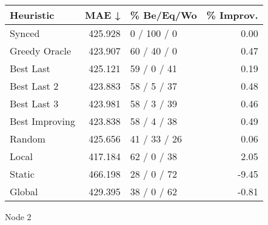 \begin{tabular}{lrlr}
\toprule
\textbf{Heuristic} & \textbf{MAE ↓} & \textbf{\% Be/Eq/Wo} & \textbf{\% Improv.} \\
\midrule
            Synced &        425.928 &          0 / 100 / 0 &                0.00 \\
     Greedy Oracle &        423.907 &          60 / 40 / 0 &                0.47 \\
         Best Last &        425.121 &          59 / 0 / 41 &                0.19 \\
       Best Last 2 &        423.883 &          58 / 5 / 37 &                0.48 \\
       Best Last 3 &        423.981 &          58 / 3 / 39 &                0.46 \\
    Best Improving &        423.838 &          58 / 4 / 38 &                0.49 \\
            Random &        425.656 &         41 / 33 / 26 &                0.06 \\
             Local &        417.184 &          62 / 0 / 38 &                2.05 \\
            Static &        466.198 &          28 / 0 / 72 &               -9.45 \\
            Global &        429.395 &          38 / 0 / 62 &               -0.81 \\
\bottomrule
\end{tabular}
\caption{Node 2}
\label{tab:iid_lr01_le2_bs4_2}
